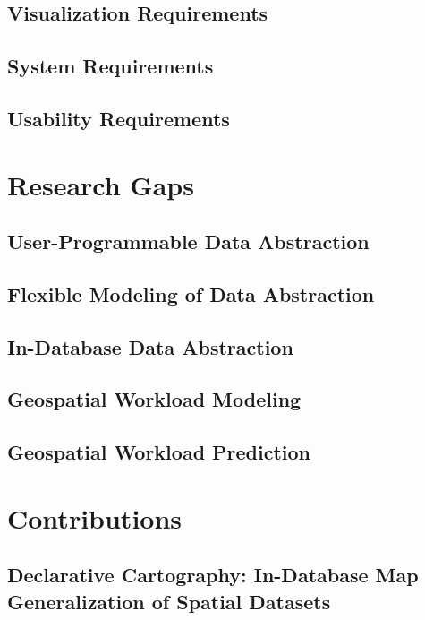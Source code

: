 \subsection{Visualization Requirements}
\subsection{System Requirements}
\subsection{Usability Requirements}

\section{Research Gaps}
\subsection{User-Programmable Data Abstraction}
\subsection{Flexible Modeling of Data Abstraction}
\subsection{In-Database Data Abstraction}
\subsection{Geospatial Workload Modeling}
\subsection{Geospatial Workload Prediction}



\section{Contributions}
\subsection{Declarative Cartography: In-Database Map Generalization of Spatial Datasets}
